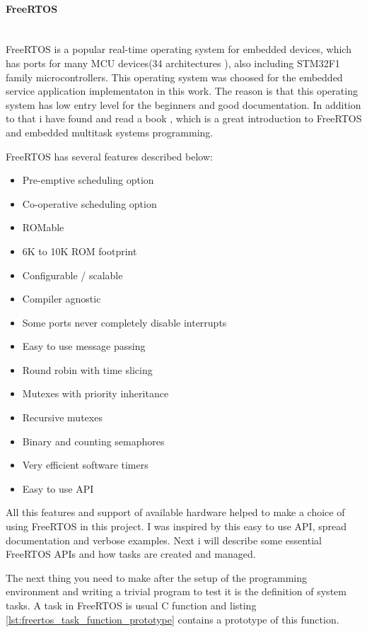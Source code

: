\paragraph{FreeRTOS} ~\\
FreeRTOS is a popular real-time operating system for embedded devices, which has
ports for many MCU devices(34 architectures \cite{FreeRTOS_website}),
also including STM32F1 family microcontrollers.
This operating system was choosed for the embedded service application implementaton in this work.
The reason is that this operating system has low entry level for the beginners and good documentation.
In addition to that i have found and read a book \cite{barry2010using}, which is a great introduction to FreeRTOS and embedded multitask systems programming. 

FreeRTOS has several features described below\cite{FreeRTOS_website}:
\begin{itemize}
\item Pre-emptive scheduling option 
\item Co-operative scheduling option
\item ROMable
\item 6K to 10K ROM footprint
\item Configurable / scalable
\item Compiler agnostic
\item Some ports never completely disable interrupts
\item Easy to use message passing
\item Round robin with time slicing
\item Mutexes with priority inheritance
\item Recursive mutexes
\item Binary and counting semaphores
\item Very efficient software timers
\item Easy to use API 
\end{itemize}

All this features and support of available hardware helped to make a choice of using FreeRTOS in this project.
I was inspired by this easy to use API, spread documentation and verbose examples.
Next i will describe some essential FreeRTOS APIs  and how tasks are created and managed.

The next thing you need to make after the setup of the programming environment and writing a trivial program to test it is the definition of system tasks.
A task in FreeRTOS is usual C function and
listing \ref{lst:freertos_task_function_prototype} contains a prototype of this
function.


